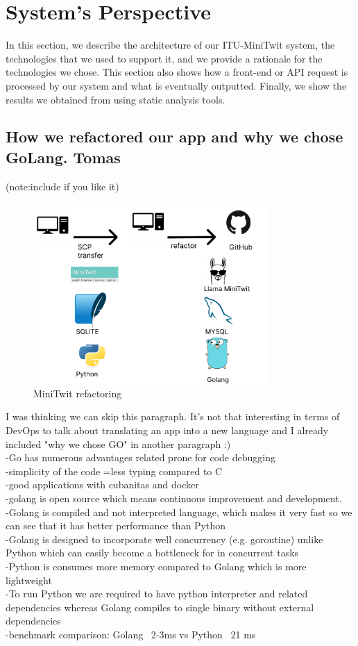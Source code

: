 \documentclass{article}
\begin{document}
\section{System's Perspective}
In this section, we describe the architecture of our ITU-MiniTwit system, the technologies that we used to support it, and we provide a rationale for the technologies we chose. This section also shows how a front-end or API request is processed by our system and what is eventually outputted. Finally, we show the results we obtained from using static analysis tools.

\subsection{How we refactored our app and why we chose GoLang. Tomas}

(note:include if you like it)
\begin{figure}[ht]
    \centering
    \includegraphics[width=0.8\textwidth]{./pdfs/refactoring.pdf} 
    \caption{MiniTwit refactoring}
    \label{fig:MiniTwit refactoring}
\end{figure}
I was thinking we can skip this paragraph. It's not that interesting in terms of DevOps to talk about translating an app into a new language and I already included "why we chose GO" in another paragraph :)
\\ -Go has numerous advantages related prone for code debugging
\\ -simplicity of the code =less typing compared to C
\\-good applications with cubanitas and docker
\\ -golang is open source which means continuous improvement and development.
\\-Golang is compiled and not interpreted language, which makes it very fast so we can see that it has better performance than Python
\\-Golang is designed to incorporate well concurrency (e.g. goroutine) unlike Python which can easily become a bottleneck for in concurrent tasks
\\-Python is consumes more memory compared to Golang which is more lightweight
\\-To run Python we are required to have python interpreter and related dependencies whereas Golang compiles to single binary without external
 dependencies
\\-benchmark comparison: Golang ~2-3ms vs Python ~21 ms
\end{document}
